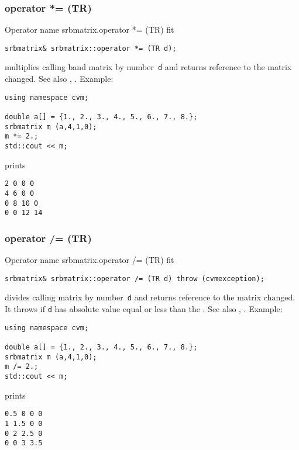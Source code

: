 \subsubsection{operator *= (TR)}
Operator%
\pdfdest name {srbmatrix.operator *= (TR)} fit
\begin{verbatim}
srbmatrix& srbmatrix::operator *= (TR d);
\end{verbatim}
multiplies  calling band matrix by  number~\verb"d"
and returns  reference to
the matrix changed.
See also ,
.
Example:
\begin{Verbatim}
using namespace cvm;

double a[] = {1., 2., 3., 4., 5., 6., 7., 8.};
srbmatrix m (a,4,1,0);
m *= 2.;
std::cout << m;
\end{Verbatim}
prints
\begin{Verbatim}
2 0 0 0
4 6 0 0
0 8 10 0
0 0 12 14
\end{Verbatim}
\newpage



\subsubsection{operator /= (TR)}
Operator%
\pdfdest name {srbmatrix.operator /= (TR)} fit
\begin{verbatim}
srbmatrix& srbmatrix::operator /= (TR d) throw (cvmexception);
\end{verbatim}
divides  calling matrix by  number~\verb"d"
and returns  reference to
the matrix changed.
It throws  
if \verb"d" has  absolute value equal or less
than the 
.
See also ,
.
Example:
\begin{Verbatim}
using namespace cvm;

double a[] = {1., 2., 3., 4., 5., 6., 7., 8.};
srbmatrix m (a,4,1,0);
m /= 2.;
std::cout << m;
\end{Verbatim}
prints
\begin{Verbatim}
0.5 0 0 0
1 1.5 0 0
0 2 2.5 0
0 0 3 3.5
\end{Verbatim}
\newpage



